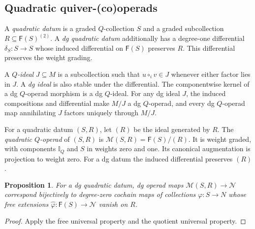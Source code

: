 \documentclass[11pt,letterpaper]{article}
\numberwithin{equation}{section}
\theoremstyle{plain}
\newtheorem{prop}[thm]{Proposition}
\theoremstyle{definition}
\theoremstyle{remark}
\begin{document}
\subsection{Quadratic quiver-(co)operads}
\label{ss_quadratic}

A \textit{quadratic datum} is a graded $Q$-collection $S$ and a graded subcollection $R\subseteq\mathsf F(S)^{(2)}$. A \textit{dg quadratic datum} additionally has a degree-one differential $\delta_S:S\to S$ whose induced differential on $\mathsf F(S)$ preserves $R$. This differential preserves the weight grading.

A \textit{$Q$-ideal} $J\subseteq M$ is a subcollection such that $u\circ_i v\in J$ whenever either factor lies in $J$. A \textit{dg ideal} is also stable under the differential.
The componentwise kernel of a dg $Q$-operad morphism is a dg $Q$-ideal.
For any dg ideal $J$, the induced compositions and differential make
$M/J$ a dg $Q$-operad, and every dg $Q$-operad map annihilating $J$
factors uniquely through $M/J$.

For a quadratic datum $(S,R)$, let $(R)$ be the ideal generated by $R$. The \textit{quadratic $Q$-operad} of $(S,R)$ is $\mathscr M(S,R)=\mathsf F(S)/(R)$. It is weight graded, with components $\mathbb I_Q$ and $S$ in weights zero and one. Its canonical augmentation is projection to weight zero. For a dg datum the induced differential preserves $(R)$.
\begin{prop}\label{prop_dg_quadratic_operad_generators}
For a dg quadratic datum, dg operad maps $\mathscr M(S,R)\to\mathscr N$ correspond bijectively to degree-zero cochain maps of collections $\varphi:S\to N$ whose free extensions $\widehat\varphi:\mathsf F(S)\to\mathscr N$ vanish on $R$.
\end{prop}
\begin{proof}
Apply the free universal property and the quotient universal property.
\end{proof}
\end{document}
